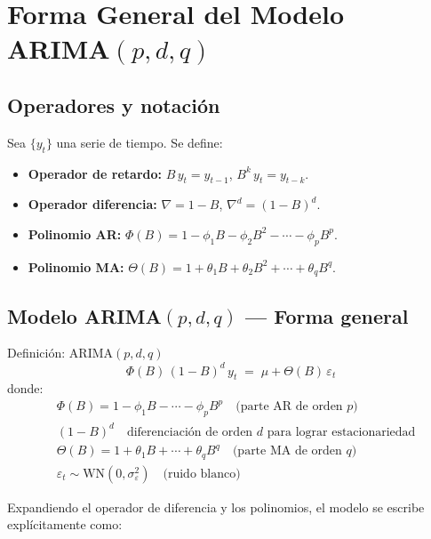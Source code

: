 \documentclass[12pt,a4paper]{article}
\begin{document}
\section{Forma General del Modelo ARIMA\texorpdfstring{$(p,d,q)$}{(p,d,q)}}

\subsection{Operadores y notaci{\'o}n}

Sea $\{y_t\}$ una serie de tiempo. Se define:
\begin{itemize}
  \item \textbf{Operador de retardo:} $B\,y_t = y_{t-1}$, \quad $B^k\,y_t = y_{t-k}$.
  \item \textbf{Operador diferencia:} $\nabla = 1 - B$, \quad $\nabla^d = (1-B)^d$.
  \item \textbf{Polinomio AR:} $\Phi(B) = 1 - \phi_1 B - \phi_2 B^2 - \cdots - \phi_p B^p$.
  \item \textbf{Polinomio MA:} $\Theta(B) = 1 + \theta_1 B + \theta_2 B^2 + \cdots + \theta_q B^q$.
\end{itemize}

\subsection{Modelo ARIMA\texorpdfstring{$(p,d,q)$}{(p,d,q)} --- Forma general}

\begin{defbox}{Definici{\'o}n: ARIMA$(p,d,q)$}
\[
  \boxed{\Phi(B)\,(1-B)^d\,y_t \;=\; \mu + \Theta(B)\,\varepsilon_t}
\]
donde:
\begin{align*}
  &\Phi(B) = 1 - \phi_1 B - \cdots - \phi_p B^p \quad \text{(parte AR de orden }p\text{)}\\
  &(1-B)^d \quad\text{diferenciaci{\'o}n de orden }d\text{ para lograr estacionariedad}\\
  &\Theta(B) = 1 + \theta_1 B + \cdots + \theta_q B^q \quad\text{(parte MA de orden }q\text{)}\\
  &\varepsilon_t \sim \text{WN}(0,\sigma^2_\varepsilon) \quad \text{(ruido blanco)}
\end{align*}
\end{defbox}

Expandiendo el operador de diferencia y los polinomios, el modelo se escribe expl{\'i}citamente como:
\end{document}
